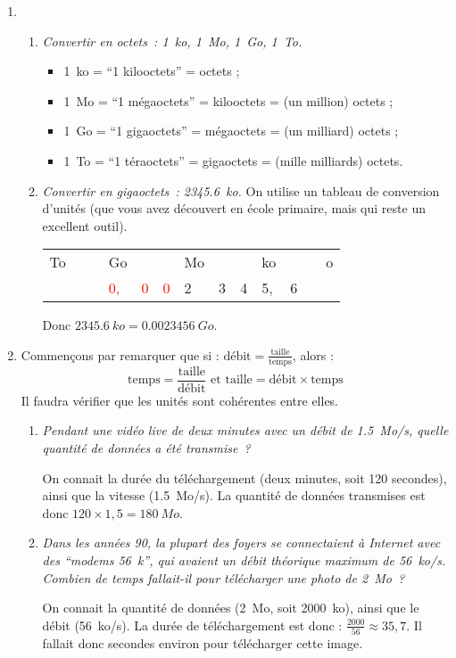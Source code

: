 \documentclass[12pt]{article}
\newcommand{\red}[1]{\textcolor{red}{#1}}
\begin{document}
\begin{enumerate}
  \item
    \begin{enumerate}
      \item \emph{Convertir en octets : \SI{1}{ko}, \SI{1}{Mo}, \SI{1}{Go}, \SI{1}{To}.}

        \begin{itemize}
          \item \SI{1}{ko} = \enquote{1 kilooctets} =  octets ;
          \item \SI{1}{Mo} = \enquote{1 mégaoctets} =  kilooctets =  (un million) octets ;
          \item \SI{1}{Go} = \enquote{1 gigaoctets} =  mégaoctets =  (un milliard) octets ;
          \item \SI{1}{To} = \enquote{1 téraoctets} =  gigaoctets =  (mille milliards) octets.
        \end{itemize}
      \item \emph{Convertir en gigaoctets : \SI{2345,6}{ko}.} On utilise un tableau de conversion d'unités (que vous avez découvert en école primaire, mais qui reste un excellent outil).

        \begin{center}\begin{tabular}{*{13}{|p{6mm}}}
            To &&& Go &&& Mo &&& ko &&& o \\
            &&&  \red{0,} &\red{0}&\red{0}&   2&3&4&5,&6&&
        \end{tabular}\end{center}
        Donc $\SI{2345,6}{ko}=\SI{0,0023456}{Go}$.
    \end{enumerate}
  \item Commençons par remarquer que si : $\text{débit}=\frac{\text{taille}}{\text{temps}}$, alors :
    \[\text{temps}=\frac{\text{taille}}{\text{débit}} \text{ et } \text{taille}=\text{débit}\times\text{temps}\]
    Il faudra vérifier que les unités sont cohérentes entre elles.
    \begin{enumerate}
      \item \emph{Pendant une vidéo \emph{live} de deux minutes avec un débit de \SI{1,5}{Mo/s}, quelle quantité de données a été transmise ?}

        On connait la durée du téléchargement (deux minutes, soit 120 secondes), ainsi que la vitesse (\SI{1,5}{Mo/s}). La quantité de données transmises est donc $120\times1,5=\SI{180}{Mo}$.
      \item \emph{Dans les années 90, la plupart des foyers se connectaient à Internet avec des \enquote{modems \SI{56}{k}}, qui avaient un débit théorique maximum de \SI{56}{ko/s}. Combien de temps fallait-il pour télécharger une photo de \SI{2}{Mo} ?}

        On connait la quantité de données (\SI{2}{Mo}, soit \SI{2000}{ko}), ainsi que le débit (\SI{56}{ko/s}). La durée de téléchargement est donc :
        $\frac{2000}{56}\approx35,7$. Il fallait donc  secondes environ pour télécharger cette image.
    \end{enumerate}
\end{enumerate}
\end{document}
